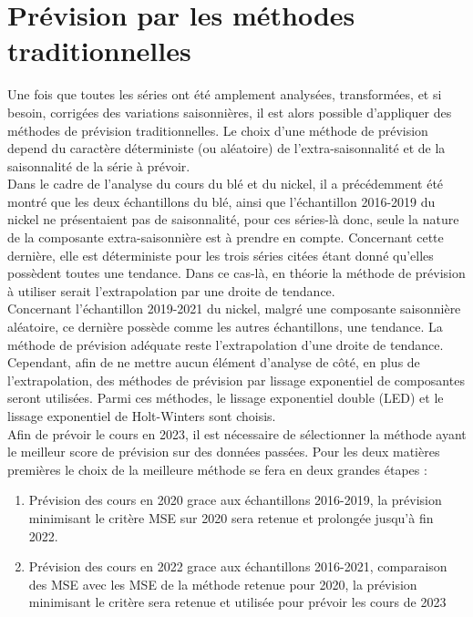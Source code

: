\section{Prévision par les méthodes traditionnelles}\label{sec:tradi}
Une fois que toutes les séries ont été amplement analysées, transformées, et si besoin, corrigées des variations saisonnières, il est alors possible d'appliquer des 
méthodes de prévision traditionnelles. Le choix d'une méthode de prévision depend du caractère déterministe (ou aléatoire) de l'extra-saisonnalité et de la saisonnalité de
la série à prévoir. \\[11pt]
Dans le cadre de l'analyse du cours du blé et du nickel, il a précédemment été montré que les deux échantillons du blé, ainsi que l'échantillon 2016-2019 
du nickel ne présentaient pas de saisonnalité, pour ces séries-là donc, seule la nature de la composante extra-saisonnière est à prendre en compte. Concernant cette 
dernière, elle est déterministe pour les trois séries citées étant donné qu'elles possèdent toutes une tendance. Dans ce cas-là, en théorie la méthode de prévision à 
utiliser serait l'extrapolation par une droite de tendance.\\[11pt]
Concernant l'échantillon 2019-2021 du nickel, malgré une composante saisonnière aléatoire, ce dernière possède comme les autres échantillons, une tendance. La méthode de 
prévision adéquate reste l'extrapolation d'une droite de tendance.\\[11pt]
Cependant, afin de ne mettre aucun élément d'analyse de côté, en plus de l'extrapolation, des méthodes de prévision par lissage exponentiel de composantes seront 
utilisées. Parmi ces méthodes, le lissage exponentiel double (LED) et le lissage exponentiel de Holt-Winters sont choisis. \\[11pt]
Afin de prévoir le cours en 2023, il est nécessaire de sélectionner la méthode ayant le meilleur score de prévision sur des données passées. Pour les deux matières 
premières le choix de la meilleure méthode se fera en deux grandes étapes :
\begin{enumerate}
    \item Prévision des cours en 2020 grace aux échantillons 2016-2019, la prévision minimisant le critère MSE sur 2020 sera retenue et prolongée jusqu'à fin 2022.
    \item Prévision des cours en 2022 grace aux échantillons 2016-2021, comparaison des MSE avec les MSE de la méthode retenue pour 2020, la prévision minimisant le 
            critère sera retenue et utilisée pour prévoir les cours de 2023 
\end{enumerate}


